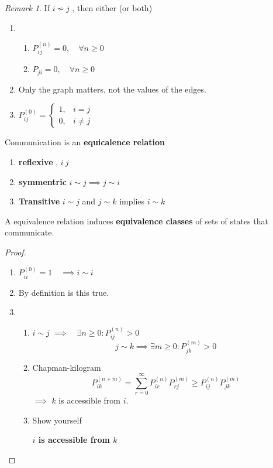 \documentclass{article}
\theoremstyle{remark}
\newtheorem*{remark}{Remark}
\newcommand{\newpara}
  {
  \vskip 0.4cm
  }
\begin{document}
\begin{remark}
  If $ i \not \sim  j$ , then either (or both)
  \begin{enumerate}[label=(\alph*)]
    \item
    \begin{enumerate}[label=(\roman*)]
    \item $P^{(n)}_{ij} = 0, \quad  \forall n\ge0 $
    \item  $P_{ji} = 0, \quad  \forall n\ge0 $
    \end{enumerate}
  \item Only the graph matters, not the values of the edges.
  \item $P^{(0)}_{ij} = \begin{cases}
    1,  &  i = j \\
    0,  &  i\neq j
  \end{cases}$

  \end{enumerate}
\end{remark}

\begin{theorem}
  Communication is an \textbf{equicalence relation}
  \begin{enumerate}[label=(\roman*)]
    \item \textbf{reflexive} , $i ~ j$
    \item  \textbf{symmentric }  $i \sim  j \implies  j \sim i$
    \item \textbf{Transitive}  $i \sim j$ and $ j \sim k$ implies $i \sim k$
  \end{enumerate}
  A equivalence relation induces \textbf{equivalence classes} of sets of states that communicate.
\end{theorem}

\begin{proof}
  \begin{enumerate}[label=(\roman*)]
    \item $P ^{\left( 0 \right)} _{ii} = 1 \quad  \implies  i \sim i   $
    \item By definition is this true.
    \item
      \begin{enumerate}[label=(\alph*)]
        \item $ i \sim j$ $\implies  \quad  \exists n\ge 0: P ^{(n)} _{ij} > 0 $ \[
        j \sim  k \implies  \exists m\ge 0 : P^{(m)} _{jk} > 0
        \]
      \item Chapman-kilogram \[
      P^{(n+m)} _{ik} = \sum_{r=0}^{\infty} P^{(n)}_{ir} P^{(m)}_{rj} \ge P^{(n)}_{ij} P^{(m)}_{jk}
      \]
      $\implies $ $k$ is accessible from $i$.
    \item Show yourself

      \newpara
      \textbf{$i$ is accessible from $k$}

      \end{enumerate}
  \end{enumerate}
\end{proof}
\end{document}
